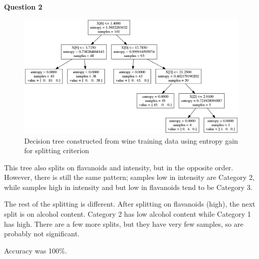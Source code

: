 \documentclass{article}
\begin{document}
	\newpage
	\noindent
	\textbf{Question 2}
	\begin{figure}[h]
		\includegraphics[scale=0.4]{entropy_tree.png}
		\caption{Decision tree constructed from wine training data using entropy gain for splitting criterion}
	\end{figure}
	\par 
	This tree also splits on flavanoids and intensity, but in the opposite order. However, there is still the same pattern; samples low in intensity are Category 2, while samples high in intensity and but low in flavanoids tend to be Category 3.
	\par
	The rest of the splitting is different. After splitting on flavanoids (high), the next split is on alcohol content. Category 2 has low alcohol content while Category 1 has high. There are a few more splits, but they have very few samples, so are probably not significant.
	\par 
	Accuracy was 100\%.\\\\
	
\end{document}
